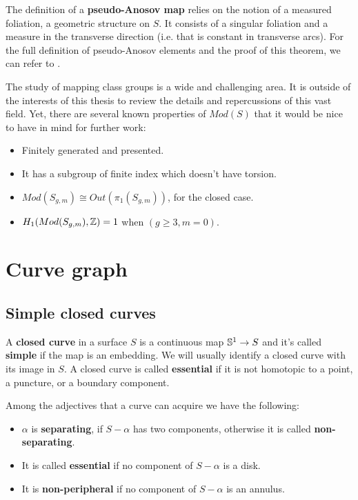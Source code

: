 The definition of a \textbf{pseudo-Anosov map} relies on the notion of a measured foliation, a geometric structure on $S$. It consists of a singular foliation and a measure in the transverse direction (i.e. that is constant in transverse arcs). For the full definition of pseudo-Anosov elements and the proof of this theorem, we can refer to \cite[Farb, ch.~13]{Farb}.

The study of mapping class groups is a wide and challenging area. It is outside of the interests of this thesis to review the details and repercussions of this vast field. Yet, there are several known properties of $Mod(S)$ that it would be nice to have in mind for further work:

\begin{itemize}
\item Finitely generated and presented.
\item It has a subgroup of finite index which doesn't have torsion.
\item $Mod(S_{g,m}) \cong Out(\pi_{1}(S_{g,m}))$, for the closed case.
\item $H_{1}(Mod(S_{g,m}), \Z) = 1$ when $(g\geq3, m=0)$.
\end{itemize}

\section{Curve graph}

\subsection{Simple closed curves}

\begin{defini}
A \textbf{closed curve} in a surface $S$ is a continuous map $\S^{1}\to S$ and it's called \textbf{simple} if the map is an embedding. We will usually identify a closed curve with its image in $S$. A closed curve is called \textbf{essential} if it is not homotopic to a point, a puncture, or a boundary component.
\end{defini}
Among the adjectives that a curve can acquire we have the following:
\begin{itemize}
    \item $\alpha$ is \textbf{separating}, if $S-\alpha$ has two components, otherwise it is called \textbf{non-separating}.
    \item It is called \textbf{essential} if no component of $S- \alpha$ is a disk.
    \item It is \textbf{non-peripheral} if no component of $S - \alpha$ is an annulus. 
\end{itemize}

